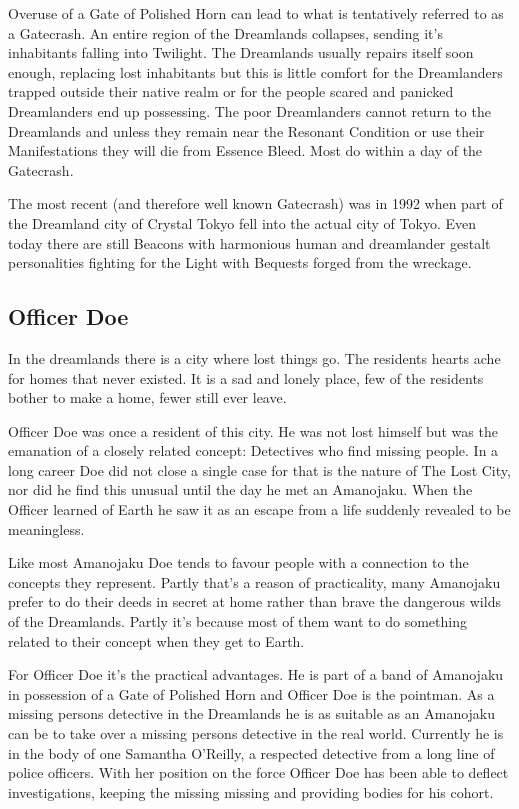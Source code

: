 Overuse of a Gate of Polished Horn can lead to what is tentatively referred to as a Gatecrash. An entire region of the Dreamlands collapses, sending it's inhabitants falling into Twilight. The Dreamlands usually repairs itself soon enough, replacing lost inhabitants but this is little comfort for the Dreamlanders trapped outside their native realm or for the people scared and panicked Dreamlanders end up possessing. The poor Dreamlanders cannot return to the Dreamlands and unless they remain near the Resonant Condition or use their Manifestations they will die from Essence Bleed. Most do within a day of the Gatecrash. 

The most recent (and therefore well known Gatecrash) was in 1992 when part of the Dreamland city of Crystal Tokyo fell into the actual city of Tokyo. Even today there are still Beacons with harmonious human and dreamlander gestalt personalities fighting for the Light with Bequests forged from the wreckage. 

\subsection*{Officer Doe}

In the dreamlands there is a city where lost things go. The residents hearts ache for homes that never existed. It is a sad and lonely place, few of the residents bother to make a home, fewer still ever leave. 

Officer Doe was once a resident of this city. He was not lost himself but was the emanation of a closely related concept: Detectives who find missing people. In a long career Doe did not close a single case for that is the nature of The Lost City, nor did he find this unusual until the day he met an Amanojaku. When the Officer learned of Earth he saw it as an escape from a life suddenly revealed to be meaningless.

Like most Amanojaku Doe tends to favour people with a connection to the concepts they represent. Partly that's a reason of practicality, many Amanojaku prefer to do their deeds in secret at home rather than brave the dangerous wilds of the Dreamlands. Partly it's because most of them want to do something related to their concept when they get to Earth.

For Officer Doe it's the practical advantages. He is part of a band of Amanojaku in possession of a Gate of Polished Horn and Officer Doe is the pointman. As a missing persons detective in the Dreamlands he is as suitable as an Amanojaku can be to take over a missing persons detective in the real world. Currently he is in the body of one Samantha O'Reilly, a respected detective from a long line of police officers. With her position on the force Officer Doe has been able to deflect investigations, keeping the missing missing and providing bodies for his cohort. 

